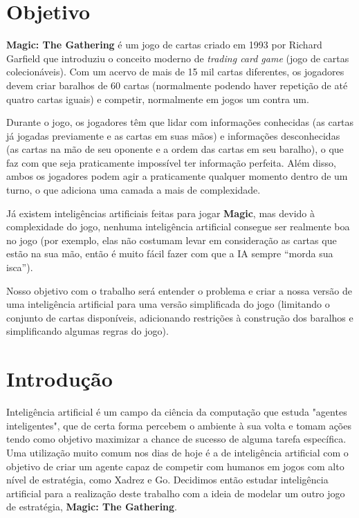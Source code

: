 \documentclass[dvipsnames]{book}
\begin{document}
\chapter*{Objetivo}
\textbf{Magic: The Gathering} é um jogo de cartas criado em 1993 por
Richard Garfield que introduziu o conceito moderno de \textit{trading
card game} (jogo de cartas colecionáveis). Com um acervo de mais de 15
mil cartas diferentes, os jogadores devem criar baralhos de 60 cartas
(normalmente podendo haver repetição de até quatro cartas iguais) e
competir, normalmente em jogos um contra um.
\par Durante o jogo, os jogadores têm que lidar com informações
conhecidas (as cartas já jogadas previamente e as cartas em suas mãos) e
informações desconhecidas (as cartas na mão de seu oponente e a ordem
das cartas em seu baralho), o que faz com que seja praticamente
impossível ter informação perfeita. Além disso, ambos os jogadores podem
agir a praticamente qualquer momento dentro de um turno, o que adiciona
uma camada a mais de complexidade.
\par Já existem inteligências artificiais feitas para jogar
\textbf{Magic}, mas devido à complexidade do jogo, nenhuma inteligência
artificial consegue ser realmente boa no jogo (por exemplo, elas não
costumam levar em consideração as cartas que estão na sua mão, então é
muito fácil fazer com que a IA sempre ``morda sua isca'').
\par Nosso objetivo com o trabalho será entender o problema e criar a
nossa versão de uma inteligência artificial para uma versão simplificada
do jogo (limitando o conjunto de cartas disponíveis, adicionando
restrições à construção dos baralhos e simplificando algumas regras do
jogo).

\chapter{Introdução}

Inteligência artificial é um campo da ciência da computação que estuda
"agentes inteligentes", que de certa forma percebem o ambiente à sua volta
e tomam ações tendo como objetivo maximizar a chance de sucesso de alguma
tarefa específica. Uma utilização muito comum nos dias de hoje é a de
inteligência artificial com o objetivo de criar um agente capaz de competir
com humanos em jogos com alto nível de estratégia, como Xadrez e Go.
Decidimos então estudar inteligência artificial para a realização deste
trabalho com a ideia de modelar um outro jogo de estratégia,
\textbf{Magic: The Gathering}.
\end{document}
